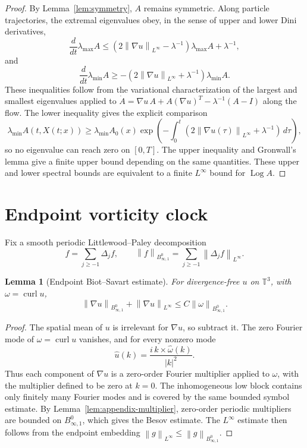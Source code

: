 \documentclass[11pt]{article}
\numberwithin{equation}{section}
\newtheorem{lemma}[theorem]{Lemma}
\newcommand{\T}{\mathbb T}
\newcommand{\Id}{I}
\newcommand{\curl}{\operatorname{curl}}
\newcommand{\Log}{\operatorname{Log}}
\newcommand{\Besov}{B^0_{\infty,1}}
\newcommand{\norm}[1]{\left\lVert #1\right\rVert}
\begin{document}
\begin{proof}
By Lemma~\ref{lem:symmetry}, \(A\) remains symmetric.  Along particle
trajectories, the extremal eigenvalues obey, in the sense of upper and lower
Dini derivatives,
\[
  \frac{d}{dt}\lambda_{\max}A
  \le
  (2\norm{\nabla u}_{L^\infty}-\lambda^{-1})\lambda_{\max}A+\lambda^{-1},
\]
and
\[
  \frac{d}{dt}\lambda_{\min}A
  \ge
  -(2\norm{\nabla u}_{L^\infty}+\lambda^{-1})\lambda_{\min}A .
\]
These inequalities follow from the variational characterization of the
largest and smallest eigenvalues applied to
\(\dot A=\nabla u\,A+A(\nabla u)^T-\lambda^{-1}(A-\Id)\) along the flow.
The lower inequality gives the explicit comparison
\[
  \lambda_{\min}A(t,X(t;x))
  \ge
  \lambda_{\min}A_0(x)
  \exp\left(
  -\int_0^t(2\norm{\nabla u(\tau)}_{L^\infty}+\lambda^{-1})\,d\tau
  \right),
\]
so no eigenvalue can reach zero on \([0,T]\).  The upper inequality and
Gronwall's lemma give a finite upper bound depending on the same quantities.
These upper and lower spectral bounds are equivalent to a finite
\(L^\infty\) bound for \(\Log A\).
\end{proof}

\section{Endpoint vorticity clock}

Fix a smooth periodic Littlewood--Paley decomposition
\[
  f=\sum_{j\ge -1}\Delta_jf,\qquad
  \norm{f}_{\Besov}=\sum_{j\ge -1}\norm{\Delta_jf}_{L^\infty}.
\]

\begin{lemma}[Endpoint Biot--Savart estimate]
\label{lem:biot}
For divergence-free \(u\) on \(\T^3\), with \(\omega=\curl u\),
\begin{equation}
  \norm{\nabla u}_{\Besov}
  +
  \norm{\nabla u}_{L^\infty}
  \le C\norm{\omega}_{\Besov}.
  \label{eq:biot}
\end{equation}
\end{lemma}

\begin{proof}
The spatial mean of \(u\) is irrelevant for \(\nabla u\), so subtract it.  The
zero Fourier mode of \(\omega=\curl u\) vanishes, and for every nonzero mode
\[
  \widehat u(k)=\frac{i\,k\times\widehat\omega(k)}{|k|^2}.
\]
Thus each component of \(\nabla u\) is a zero-order Fourier multiplier applied
to \(\omega\), with the multiplier defined to be zero at \(k=0\).  The
inhomogeneous low block contains only finitely many Fourier modes and is
covered by the same bounded symbol estimate.  By
Lemma~\ref{lem:appendix-multiplier}, zero-order periodic multipliers are
bounded on \(B^0_{\infty,1}\), which gives the Besov estimate.  The
\(L^\infty\) estimate then follows from the endpoint embedding
\(\norm{g}_{L^\infty}\le\norm{g}_{B^0_{\infty,1}}\).
\end{proof}
\end{document}
